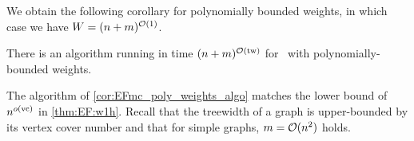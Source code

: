 We obtain the following corollary for polynomially bounded weights, in which case we have $W = (n+m)^{\mathcal{O}(1)}$.%

\begin{corollary}\label{cor:EFmc_poly_weights_algo}
    There is an algorithm running in time $(n+m)^{\mathcal{O}(\mathrm{tw})}$ for \EFmc\ with polynomially-bounded weights.
\end{corollary}

\begin{remark}\label{remark:EF:tw}
    The algorithm of \cref{cor:EFmc_poly_weights_algo} matches the lower bound of $n^{o(\mathrm{vc})}$ in \cref{thm:EF:w1h}.
    Recall that the treewidth of a graph is upper-bounded by its vertex cover number and that for simple graphs, $m = \mathcal{O}(n^2)$ holds.
\end{remark}


